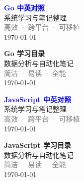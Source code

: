 \documentclass[UTF8, a4paper, 12pt]{ctexart}
\begin{document}

\clearpage

\thispagestyle{empty}
\vspace*{\fill}
\begin{center}
    \textcolor{blue}{\Huge\textbf{Go 中英对照}} \\[1em]
    \textcolor{blue!60!black}{\Large 系统学习与笔记整理} \\[2em]
    \textcolor{gray}{\large 高效 · 跨平台 · 可移植} \\[1m]
    \today
\end{center}
\vspace*{\fill}
\clearpage


\clearpage
\thispagestyle{empty}
\vspace*{\fill}
\begin{center}
    \textcolor{green!70!black}{\Huge\textbf{Go 学习目录}} \\[1em]
    \textcolor{green!40!black}{\Large 数据分析与自动化笔记} \\[2em]
    \textcolor{gray}{\large 简洁 · 易读 · 全能} \\[1em]
    \today
\end{center}
\vspace*{\fill}
\clearpage


\clearpage


\thispagestyle{empty}
\vspace*{\fill}
\begin{center}
    \textcolor{blue}{\Huge\textbf{JavaScript 中英对照}} \\[1em]
    \textcolor{blue!60!black}{\Large 系统学习与笔记整理} \\[2em]
    \textcolor{gray}{\large 高效 · 跨平台 · 可移植} \\[1m]
    \today
\end{center}
\vspace*{\fill}
\clearpage


\clearpage
\thispagestyle{empty}
\vspace*{\fill}
\begin{center}
    \textcolor{green!70!black}{\Huge\textbf{JavaScript 学习目录}} \\[1em]
    \textcolor{green!40!black}{\Large 数据分析与自动化笔记} \\[2em]
    \textcolor{gray}{\large 简洁 · 易读 · 全能} \\[1em]
    \today
\end{center}
\vspace*{\fill}
\clearpage
\end{document}

